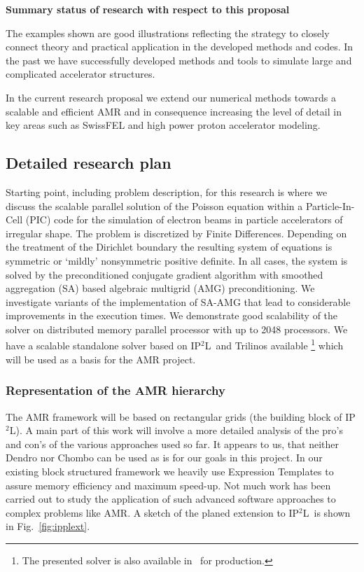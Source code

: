 \documentclass[11pt,pdftex]{article}
\renewcommand{\ippl}{\textsc{IP$^{2}$L}}
\begin{document}
\noindent \textbf{{Summary status of research with respect to
    this proposal}}

The examples shown are good illustrations reflecting the strategy to
closely connect theory and practical application in the developed
methods and codes. In the past we have successfully developed methods
and tools to simulate large and complicated accelerator structures.

In the current research proposal we extend our numerical methods towards
a scalable and efficient AMR and in consequence increasing the level of
detail in key areas such as SwissFEL and high power proton accelerator
modeling.



\subsection{Detailed research plan}

Starting point, including problem description, for this research is \cite{adai:10,adai:11} where we
discuss the scalable parallel solution of the Poisson equation within a
Particle-In-Cell (PIC) code for the simulation of electron beams in
particle accelerators of irregular shape.  The problem is discretized by
Finite Differences.  Depending on the treatment of the Dirichlet
boundary the resulting system of equations is symmetric or `mildly'
nonsymmetric positive definite.  In all cases, the system is solved by
the preconditioned conjugate gradient algorithm with smoothed
aggregation (SA) based algebraic multigrid (AMG) preconditioning.  We
investigate variants of the implementation of SA-AMG that lead to
considerable improvements in the execution times.  We demonstrate good
scalability of the solver on distributed memory parallel processor with
up to 2048 processors.  We have a scalable standalone solver based on
\ippl\ and Trilinos available \footnote{The presented solver is also
  available in \opal\ for production.}  which will be used as a basis
for the AMR project.



\subsubsection{Representation of the AMR hierarchy}

The AMR framework will be based on rectangular grids (the building block
of \ippl).  A main part of this work will involve a more detailed
analysis of the pro's and con's of the various approaches used so far.
It appears to us, that neither \textsf{Dendro} nor \textsf{Chombo} can
be used as is for our goals in this project.  In our existing block
structured framework we heavily use Expression Templates \cite{hae2010}
to assure memory efficiency and maximum speed-up.  Not much work has
been carried out to study the application of such advanced software
approaches to complex problems like AMR.  A sketch of the planed
extension to \ippl\ is shown in Fig.~\ref{fig:ipplext}.
\end{document}
